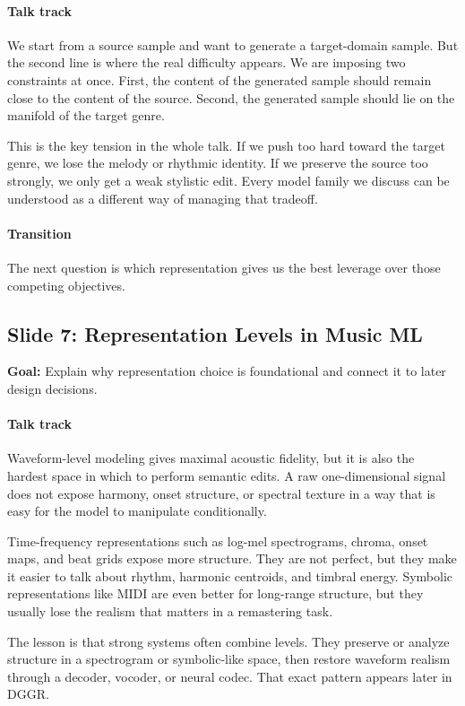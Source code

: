 \documentclass[11pt]{article}
\begin{document}
\paragraph{Talk track}
We start from a source sample and want to generate a target-domain sample. But the second line is where the real difficulty appears. We are imposing two constraints at once. First, the content of the generated sample should remain close to the content of the source. Second, the generated sample should lie on the manifold of the target genre.

This is the key tension in the whole talk. If we push too hard toward the target genre, we lose the melody or rhythmic identity. If we preserve the source too strongly, we only get a weak stylistic edit. Every model family we discuss can be understood as a different way of managing that tradeoff.

\paragraph{Transition}
The next question is which representation gives us the best leverage over those competing objectives.

\subsection*{Slide 7: Representation Levels in Music ML}
\textbf{Goal:} Explain why representation choice is foundational and connect it to later design decisions.
\paragraph{Talk track}
Waveform-level modeling gives maximal acoustic fidelity, but it is also the hardest space in which to perform semantic edits. A raw one-dimensional signal does not expose harmony, onset structure, or spectral texture in a way that is easy for the model to manipulate conditionally.

Time-frequency representations such as log-mel spectrograms, chroma, onset maps, and beat grids expose more structure. They are not perfect, but they make it easier to talk about rhythm, harmonic centroids, and timbral energy. Symbolic representations like MIDI are even better for long-range structure, but they usually lose the realism that matters in a remastering task.

The lesson is that strong systems often combine levels. They preserve or analyze structure in a spectrogram or symbolic-like space, then restore waveform realism through a decoder, vocoder, or neural codec. That exact pattern appears later in DGGR.
\end{document}
